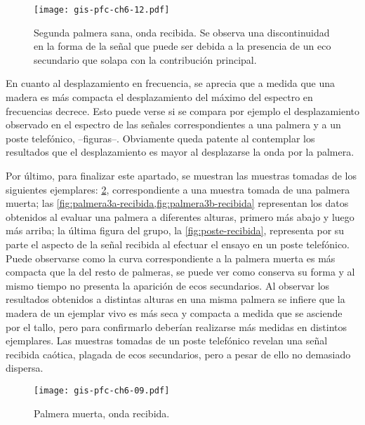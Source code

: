 \begin{figure}[p]
    \begin{center}
	\texttt{[image: gis-pfc-ch6-12.pdf]}
    \end{center}
    \caption[Segunda palmera sana (onda recibida)]{Segunda palmera sana,
    onda recibida. Se observa una discontinuidad en la forma de la señal
    que puede ser debida a la presencia de un eco secundario que solapa con
    la contribución principal.}
    \label{fig:palmera2-recibida}
\end{figure}

En cuanto al desplazamiento en frecuencia, se aprecia que a medida que una
madera es más compacta el desplazamiento del máximo del espectro en
frecuencias decrece. Esto puede verse si se compara por ejemplo el
desplazamiento observado en el espectro de las señales correspondientes a
una palmera y a un poste telefónico,  --figuras--. Obviamente queda patente
al contemplar los resultados que el desplazamiento es mayor al desplazarse
la onda por la palmera.

Por último, para finalizar este apartado, se muestran las muestras tomadas
de los siguientes ejemplares: \cref{fig:palmeramuerta-recibida},
correspondiente a una muestra tomada de una palmera muerta; las
\cref{fig:palmera3a-recibida,fig:palmera3b-recibida} representan los datos
obtenidos al evaluar una palmera a diferentes alturas, primero más abajo y
luego más arriba; la última figura del grupo, la \cref{fig:poste-recibida},
representa por su parte el aspecto de la señal recibida al efectuar el
ensayo en un poste telefónico. Puede observarse como la curva
correspondiente a la palmera muerta es más compacta que la del resto de
palmeras, se puede ver como conserva su forma y al mismo tiempo no presenta
la aparición de ecos secundarios. Al observar los resultados obtenidos a
distintas alturas en una misma palmera se infiere que la madera de un
ejemplar vivo es más seca y compacta a medida que se asciende por el tallo,
pero para confirmarlo deberían realizarse más medidas en distintos
ejemplares. Las muestras tomadas de un poste telefónico revelan una señal
recibida caótica, plagada de ecos secundarios, pero a pesar de ello no
demasiado dispersa.

\sshortpage[]

\begin{figure}[p]
    \begin{center}
	\texttt{[image: gis-pfc-ch6-09.pdf]}
    \end{center}
    \caption[Palmera muerta (onda recibida)]{Palmera muerta, onda
    recibida.}
    \label{fig:palmeramuerta-recibida}
\end{figure}

